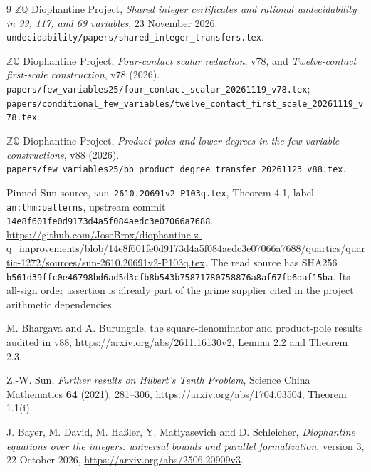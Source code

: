 \documentclass[11pt]{article}
\begin{document}
\begin{thebibliography}{9}
\(\mathbb Z\mathbb Q\) Diophantine Project,
\emph{Shared integer certificates and rational undecidability in
99, 117, and 69 variables}, 23 November 2026.
\nolinkurl{undecidability/papers/shared_integer_transfers.tex}.

\(\mathbb Z\mathbb Q\) Diophantine Project,
\emph{Four-contact scalar reduction}, v78, and
\emph{Twelve-contact first-scale construction}, v78 (2026).
\nolinkurl{papers/few_variables25/four_contact_scalar_20261119_v78.tex};
\nolinkurl{papers/conditional_few_variables/twelve_contact_first_scale_20261119_v78.tex}.

\(\mathbb Z\mathbb Q\) Diophantine Project,
\emph{Product poles and lower degrees in the few-variable
constructions}, v88 (2026).
\nolinkurl{papers/few_variables25/bb_product_degree_transfer_20261123_v88.tex}.

Pinned Sun source, \texttt{sun-2610.20691v2-P103q.tex},
Theorem 4.1, label \texttt{an:thm:patterns}, upstream commit
\texttt{14e8f601fe0d9173d4a5f084aedc3e07066a7688}.
\url{https://github.com/JoseBrox/diophantine-z-q_improvements/blob/14e8f601fe0d9173d4a5f084aedc3e07066a7688/quartics/quartic-1272/sources/sun-2610.20691v2-P103q.tex}.
The read source has SHA256
\nolinkurl{b561d39ffc0e46798bd6ad5d3cfb8b543b75871780758876a8af67fb6daf15ba}.
Its all-sign order assertion is already part of the prime supplier
cited in the project arithmetic dependencies.

M. Bhargava and A. Burungale, the square-denominator and
product-pole results audited in v88,
\url{https://arxiv.org/abs/2611.16130v2},
Lemma 2.2 and Theorem 2.3.

Z.-W. Sun, \emph{Further results on Hilbert's Tenth Problem},
Science China Mathematics \textbf{64} (2021), 281--306,
\url{https://arxiv.org/abs/1704.03504}, Theorem 1.1(i).

J. Bayer, M. David, M. Ha{\ss}ler, Y. Matiyasevich and
D. Schleicher,
\emph{Diophantine equations over the integers: universal
bounds and parallel formalization}, version 3, 22 October 2026,
\url{https://arxiv.org/abs/2506.20909v3}.
\end{thebibliography}
\end{document}

